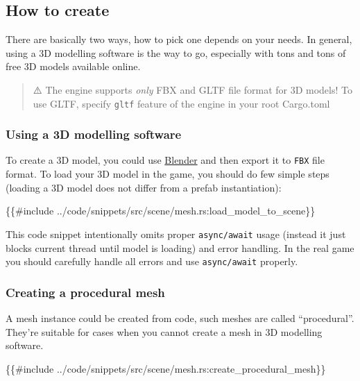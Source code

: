 \documentclass[
]{book}
\newenvironment{Shaded}{\begin{snugshade}}{\end{snugshade}}
\newcommand{\NormalTok}[1]{#1}
\theoremstyle{definition}
\theoremstyle{definition}
\theoremstyle{definition}
\theoremstyle{definition}
\theoremstyle{remark}
\begin{document}
\subsection{How to create}\label{how-to-create-3}

There are basically two ways, how to pick one depends on your needs. In general, using a 3D modelling software is the way to go, especially with tons and tons of free 3D models available online.

\begin{quote}
⚠️ The engine supports \emph{only} FBX and GLTF file format for 3D models! To use GLTF, specify \texttt{gltf} feature of the engine in your root Cargo.toml
\end{quote}

\subsubsection{Using a 3D modelling software}\label{using-a-3d-modelling-software}

To create a 3D model, you could use \href{https://www.blender.org/}{Blender} and then export it to \texttt{FBX} file format. To load your 3D model in the game, you should do few simple steps (loading a 3D model does not differ from a prefab instantiation):

\begin{Shaded}
\begin{Highlighting}[]
\NormalTok{\{\{\#include ../code/snippets/src/scene/mesh.rs:load\_model\_to\_scene\}\}}
\end{Highlighting}
\end{Shaded}

This code snippet intentionally omits proper \texttt{async/await} usage (instead it just blocks current thread until model is loading) and error handling. In the real game you should carefully handle all errors and use \texttt{async/await} properly.

\subsubsection{Creating a procedural mesh}\label{creating-a-procedural-mesh}

A mesh instance could be created from code, such meshes are called ``procedural''. They're suitable for cases when you cannot create a mesh in 3D modelling software.

\begin{Shaded}
\begin{Highlighting}[]
\NormalTok{\{\{\#include ../code/snippets/src/scene/mesh.rs:create\_procedural\_mesh\}\}}
\end{Highlighting}
\end{Shaded}
\end{document}
